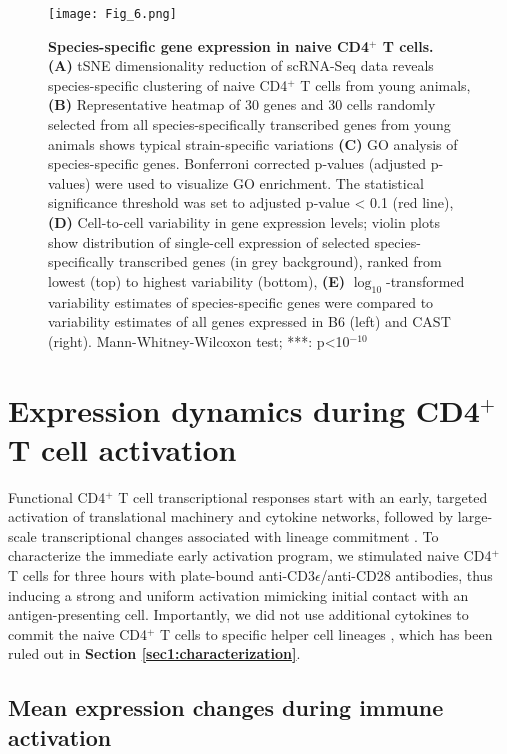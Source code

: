 \begin{figure}[!h]
\centering
\texttt{[image: Fig\_6.png]}
\caption[Species-specific gene expression in naive CD4$^+$ T cells]{\textbf{Species-specific gene expression in naive CD4$^+$ T cells.}\\
\textbf{(A)} tSNE dimensionality reduction of scRNA-Seq data reveals species-specific clustering of naive CD4$^+$ T cells from young animals, \textbf{(B)} Representative heatmap of 30 genes and 30 cells randomly selected from all species-specifically transcribed genes from young animals shows typical strain-specific variations \textbf{(C)}  GO analysis of species-specific genes. Bonferroni corrected p-values (adjusted p-values) were used to visualize GO enrichment. The statistical significance threshold was set to adjusted p-value < 0.1 (red line), \textbf{(D)} Cell-to-cell variability in gene expression levels; violin plots show distribution of single-cell expression of selected species-specifically transcribed genes (in grey background), ranked from lowest (top) to highest variability (bottom), \textbf{(E)} $\log_10$-transformed variability estimates of species-specific genes were compared to variability estimates of all genes expressed in B6 (left) and CAST (right). Mann-Whitney-Wilcoxon test; ***: p<10$^{-10}$}
\label{fig1:strain_specific}
\end{figure}

\newpage


\section{Expression dynamics during CD4$^+$ T cell activation}

Functional CD4$^+$ T cell transcriptional responses start with an early, targeted activation of translational machinery and cytokine networks, followed by large-scale transcriptional changes associated with lineage commitment \citep{Shay2013, Asmal2003}. To characterize the immediate early activation program, we stimulated naive CD4$^+$ T cells for three hours with plate-bound anti-CD3$\epsilon$/anti-CD28 antibodies, thus inducing a strong and uniform activation mimicking initial contact with an antigen-presenting cell. Importantly, we did not use additional cytokines to commit the naive CD4$^+$ T cells to specific helper cell lineages \citep{Zhu2010}, which has been ruled out in \textbf{Section \ref{sec1:characterization}}. 

\subsection{Mean expression changes during immune activation}

